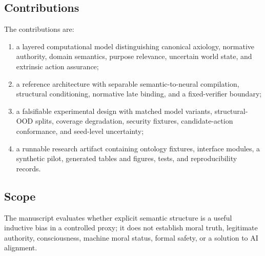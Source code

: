\subsection{Contributions}

The contributions are:

\begin{enumerate}[leftmargin=*]
  \item a layered computational model distinguishing canonical axiology, normative authority, domain semantics, purpose relevance, uncertain world state, and extrinsic action assurance;
  \item a reference architecture with separable semantic-to-neural compilation, structural conditioning, normative late binding, and a fixed-verifier boundary;
  \item a falsifiable experimental design with matched model variants, structural-OOD splits, coverage degradation, security fixtures, candidate-action conformance, and seed-level uncertainty;
  \item a runnable research artifact containing ontology fixtures, interface modules, a synthetic pilot, generated tables and figures, tests, and reproducibility records.
\end{enumerate}

\subsection{Scope}

The manuscript evaluates whether explicit semantic structure is a useful inductive bias in a controlled proxy; it does not establish moral truth, legitimate authority, consciousness, machine moral status, formal safety, or a solution to AI alignment.
